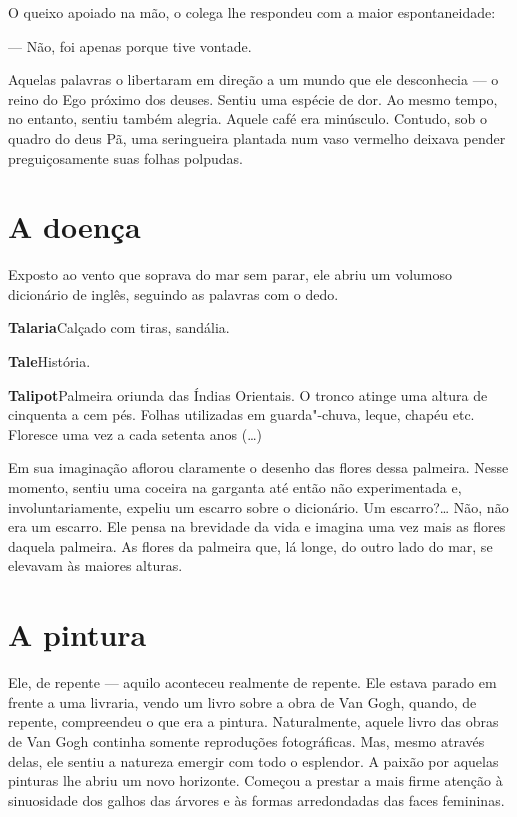 O queixo apoiado na mão, o colega lhe respondeu com a maior
espontaneidade:

--- Não, foi apenas porque tive vontade.

Aquelas palavras o libertaram em direção a um mundo que ele desconhecia
--- o reino do Ego próximo dos deuses. Sentiu uma espécie de dor. Ao
mesmo tempo, no entanto, sentiu também alegria. Aquele café era
minúsculo. Contudo, sob o quadro do deus Pã, uma seringueira plantada
num vaso vermelho deixava pender preguiçosamente suas folhas polpudas.

\section{A doença}

Exposto ao vento que soprava do mar sem parar, ele abriu um volumoso
dicionário de inglês, seguindo as palavras com o dedo.

\textbf{Talaria}\quad Calçado com tiras, sandália.

\textbf{Tale}\quad História.

\textbf{Talipot}\quad Palmeira oriunda das Índias Orientais. O tronco atinge uma
altura de cinquenta a cem pés. Folhas utilizadas em guarda"-chuva, leque, 
chapéu etc. Floresce uma vez a cada setenta anos (\ldots{})

Em sua imaginação aflorou claramente o desenho das flores dessa
palmeira. Nesse momento, sentiu uma coceira na garganta até então não
experimentada e, involuntariamente, expeliu um escarro sobre o
dicionário. Um escarro?\ldots{} Não, não era um escarro. Ele pensa na
brevidade da vida e imagina uma vez mais as flores daquela palmeira. As
flores da palmeira que, lá longe, do outro lado do mar, se elevavam às
maiores alturas.

\section{A pintura}

Ele, de repente --- aquilo aconteceu realmente de repente. Ele estava
parado em frente a uma livraria, vendo um livro sobre a obra de Van
Gogh, quando, de repente, compreendeu o que era a pintura.
Naturalmente, aquele livro das obras de Van Gogh continha somente
reproduções fotográficas. Mas, mesmo através delas, ele sentiu a
natureza emergir com todo o esplendor. A paixão por aquelas pinturas
lhe abriu um novo horizonte. Começou a prestar a mais firme atenção à
sinuosidade dos galhos das árvores e às formas arredondadas das faces
femininas.

